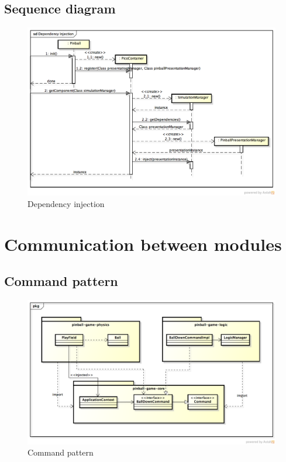 \documentclass[fontsize=12pt,
               paper=a4,
               twoside=false,
               parskip=half,
               ]{scrartcl}
\begin{document}
\subsection{Sequence diagram}

\begin{figure}[h!]
	\centering
	\includegraphics[width=15.5cm]{./img/dependency-injection-sd.png}
	\caption[Dependency injection]{Dependency injection}
	\label{fig:dependency_injection3}
\end{figure}

\section{Communication between modules}
\subsection{Command pattern}

\begin{figure}[h!]
	\centering
	\includegraphics[width=15.5cm]{./img/command-pattern1.png}
	\caption[Command pattern]{Command pattern}
	\label{fig:command_pattern}
\end{figure}
\end{document}
